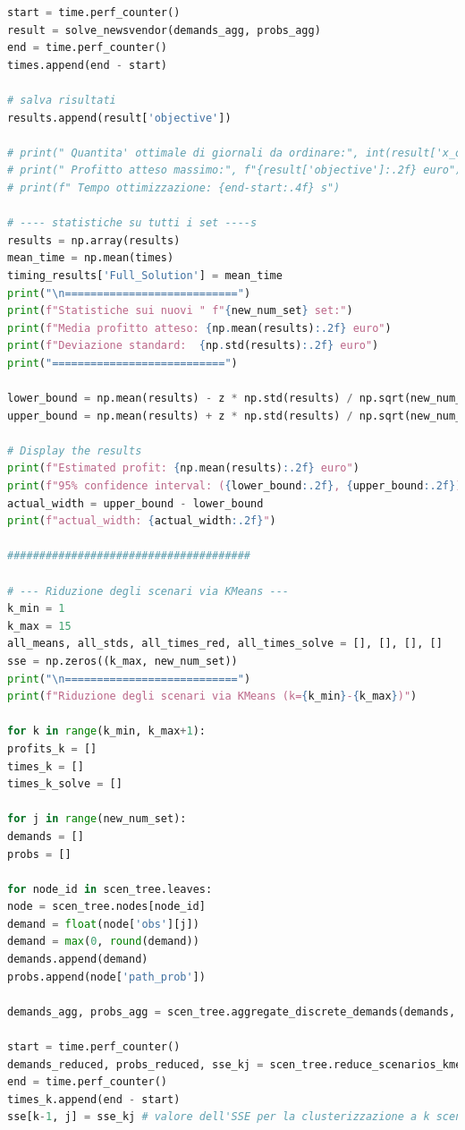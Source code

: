 \documentclass[a4paper,12pt]{article}
\begin{document}
\begin{lstlisting}[language=python,caption={Main of Newvendor problem},label={lst:main-nv}]
start = time.perf_counter()
result = solve_newsvendor(demands_agg, probs_agg)
end = time.perf_counter()
times.append(end - start)

# salva risultati
results.append(result['objective'])

# print(" Quantita' ottimale di giornali da ordinare:", int(result['x_opt']))
# print(" Profitto atteso massimo:", f"{result['objective']:.2f} euro")
# print(f" Tempo ottimizzazione: {end-start:.4f} s")

# ---- statistiche su tutti i set ----s
results = np.array(results)
mean_time = np.mean(times)
timing_results['Full_Solution'] = mean_time
print("\n===========================")
print(f"Statistiche sui nuovi " f"{new_num_set} set:")
print(f"Media profitto atteso: {np.mean(results):.2f} euro")
print(f"Deviazione standard:  {np.std(results):.2f} euro")
print("===========================")

lower_bound = np.mean(results) - z * np.std(results) / np.sqrt(new_num_set)
upper_bound = np.mean(results) + z * np.std(results) / np.sqrt(new_num_set)

# Display the results
print(f"Estimated profit: {np.mean(results):.2f} euro")
print(f"95% confidence interval: ({lower_bound:.2f}, {upper_bound:.2f})")
actual_width = upper_bound - lower_bound
print(f"actual_width: {actual_width:.2f}")

######################################

# --- Riduzione degli scenari via KMeans ---
k_min = 1
k_max = 15
all_means, all_stds, all_times_red, all_times_solve = [], [], [], []
sse = np.zeros((k_max, new_num_set))
print("\n===========================")
print(f"Riduzione degli scenari via KMeans (k={k_min}-{k_max})")

for k in range(k_min, k_max+1):
profits_k = []
times_k = []
times_k_solve = []

for j in range(new_num_set):
demands = []
probs = []

for node_id in scen_tree.leaves:
node = scen_tree.nodes[node_id]
demand = float(node['obs'][j])
demand = max(0, round(demand))
demands.append(demand)
probs.append(node['path_prob'])

demands_agg, probs_agg = scen_tree.aggregate_discrete_demands(demands, probs)

start = time.perf_counter()
demands_reduced, probs_reduced, sse_kj = scen_tree.reduce_scenarios_kmeans_1D(demands_agg, probs_agg, k=k)
end = time.perf_counter()
times_k.append(end - start)
sse[k-1, j] = sse_kj # valore dell'SSE per la clusterizzazione a k scenari, del j-esimo campione 


\end{lstlisting}
\end{document}
